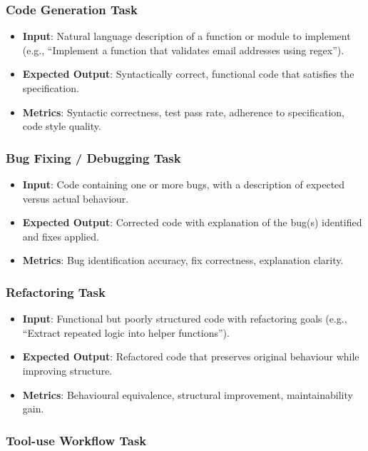 \documentclass[]
{UCD_CS_FYP_Report}
\begin{document}
\subsubsection{Code Generation Task}

\begin{itemize}
  \item \textbf{Input}: Natural language description of a function or module to implement (e.g., ``Implement a function that validates email addresses using regex'').
  \item \textbf{Expected Output}: Syntactically correct, functional code that satisfies the specification.
  \item \textbf{Metrics}: Syntactic correctness, test pass rate, adherence to specification, code style quality.
\end{itemize}

\subsubsection{Bug Fixing / Debugging Task}

\begin{itemize}
  \item \textbf{Input}: Code containing one or more bugs, with a description of expected versus actual behaviour.
  \item \textbf{Expected Output}: Corrected code with explanation of the bug(s) identified and fixes applied.
  \item \textbf{Metrics}: Bug identification accuracy, fix correctness, explanation clarity.
\end{itemize}

\subsubsection{Refactoring Task}

\begin{itemize}
  \item \textbf{Input}: Functional but poorly structured code with refactoring goals (e.g., ``Extract repeated logic into helper functions'').
  \item \textbf{Expected Output}: Refactored code that preserves original behaviour while improving structure.
  \item \textbf{Metrics}: Behavioural equivalence, structural improvement, maintainability gain.
\end{itemize}

\subsubsection{Tool-use Workflow Task}
\end{document}
